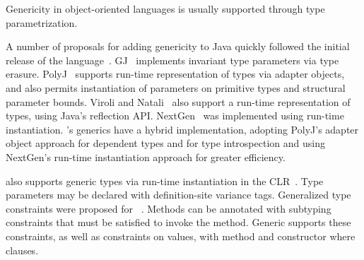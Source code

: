 Genericity in object-oriented languages is usually
supported through
type parametrization.

A number of proposals 
for adding genericity to Java quickly followed
the initial release of
the language~\cite{GJ,Pizza,java-popl97,thorup97,allen03}.
GJ~\cite{GJ} implements invariant type
parameters via type erasure.
PolyJ~\cite{java-popl97} supports run-time representation of types
via adapter objects, and also permits instantiation of
parameters on primitive types and structural parameter bounds.
Viroli and Natali~\cite{reflective-generics,type-passing-generics}
also support
a run-time representation of types, using Java's reflection API.
NextGen~\cite{nextgen,allen03} was implemented using run-time 
instantiation.
\Xten{}'s generics have a hybrid implementation, adopting PolyJ's
adapter object approach for dependent types and for 
type introspection and using NextGen's run-time
instantiation approach for greater efficiency.

\csharp also supports generic types via run-time instantiation in the
CLR~\cite{csharp-generics}.  Type parameters may be declared
with definition-site variance tags.
Generalized type constraints were proposed for
\csharp~\cite{emir06}.  Methods can be annotated with subtyping
constraints that must be satisfied to invoke the method.
Generic \Xten{} supports these constraints, as well as constraints
on values, with method and constructor where clauses.



